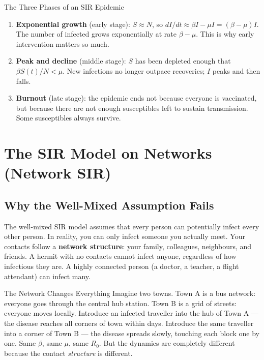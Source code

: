 \begin{keyinsight}{The Three Phases of an SIR Epidemic}
\begin{enumerate}[noitemsep]
    \item \textbf{Exponential growth} (early stage): $S \approx N$, so $dI/dt \approx \beta I - \mu I = (\beta - \mu) I$. The number of infected grows exponentially at rate $\beta - \mu$. This is why early intervention matters so much.
    \item \textbf{Peak and decline} (middle stage): $S$ has been depleted enough that $\beta S(t)/N < \mu$. New infections no longer outpace recoveries; $I$ peaks and then falls.
    \item \textbf{Burnout} (late stage): the epidemic ends not because everyone is vaccinated, but because there are not enough susceptibles left to sustain transmission. Some susceptibles always survive.
\end{enumerate}
\end{keyinsight}

\section{The SIR Model on Networks (Network SIR)}
\label{sec:network_sir}

\subsection{Why the Well-Mixed Assumption Fails}

The well-mixed SIR model assumes that every person can potentially infect every other person. In reality, you can only infect someone you actually meet. Your contacts follow a \textbf{network structure}: your family, colleagues, neighbours, and friends. A hermit with no contacts cannot infect anyone, regardless of how infectious they are. A highly connected person (a doctor, a teacher, a flight attendant) can infect many.

\begin{analogybox}{The Network Changes Everything}
Imagine two towns. Town A is a bus network: everyone goes through the central hub station. Town B is a grid of streets: everyone moves locally. Introduce an infected traveller into the hub of Town A --- the disease reaches all corners of town within days. Introduce the same traveller into a corner of Town B --- the disease spreads slowly, touching each block one by one. Same $\beta$, same $\mu$, same $R_0$. But the dynamics are completely different because the contact \emph{structure} is different.
\end{analogybox}

